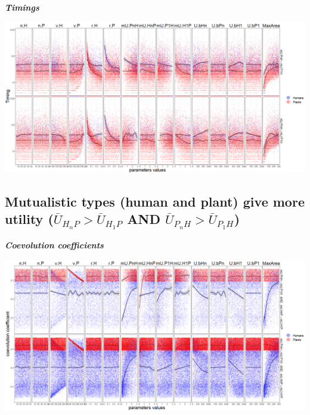 \documentclass[]{book}
\begin{document}
\textbf{\emph{Timings}}

\includegraphics[width=1\linewidth]{plots/5_multiplePar-timing-plantImprove-ggplot}

\newpage

\hypertarget{mutualistic-types-human-and-plant-give-more-utility-baru_h_np-baru_h_1p-and-baru_p_nh-baru_p_1h}{%
\subsection{\texorpdfstring{Mutualistic types (human and plant) give more utility (\(\bar{U}_{H_{n}P}> \bar{U}_{H_{1}P}\) AND \(\bar{U}_{P_{n}H}> \bar{U}_{P_{1}H}\))}{Mutualistic types (human and plant) give more utility (\textbackslash{}bar\{U\}\_\{H\_\{n\}P\}\textgreater{} \textbackslash{}bar\{U\}\_\{H\_\{1\}P\} AND \textbackslash{}bar\{U\}\_\{P\_\{n\}H\}\textgreater{} \textbackslash{}bar\{U\}\_\{P\_\{1\}H\})}}\label{mutualistic-types-human-and-plant-give-more-utility-baru_h_np-baru_h_1p-and-baru_p_nh-baru_p_1h}}


\textbf{\emph{Coevolution coefficients}}

\includegraphics[width=1\linewidth]{plots/5_multiplePar-coevo-bothImprove-ggplot}
\end{document}
